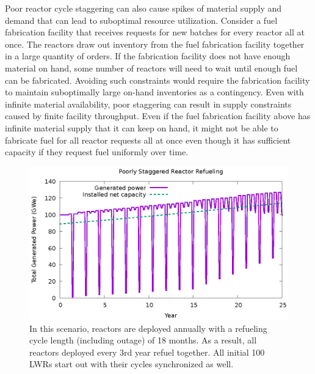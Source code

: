 \documentclass{style}
\begin{document}
Poor reactor cycle staggering can also cause spikes of material supply and
demand that can lead to suboptimal resource utilization.  Consider a fuel
fabrication facility that receives requests for new batches for every reactor
all at once.  The reactors draw out inventory from the fuel fabrication
facility together in a large quantity of orders.  If the fabrication facility
does not have enough material on hand, some number of reactors will need to
wait until enough fuel can be fabricated.  Avoiding such
constraints would require the fabrication facility to maintain suboptimally
large on-hand inventories as a contingency.  Even with infinite material
availability, poor staggering can result in supply constraints caused by
finite facility throughput. Even if the fuel fabrication facility above has
infinite material supply that it can keep on hand, it might not be able to
fabricate fuel for all reactor requests all at once even though it has
sufficient capacity if they request fuel uniformly over time.

\begin{figure}[h]
    \centering
    \includegraphics[width=1.0\columnwidth]{exp2/sync-cycle.eps}
    \caption[The cycle staggering effect]{
        In this scenario, reactors are deployed annually with a refueling cycle
        length (including outage) of 18 months.  As a result, all reactors deployed
        every 3rd year refuel together.  All initial 100 LWRs start out with
        their cycles synchronized as well.
    }
    \label{fig:sync-cycle}
\end{figure}
\end{document}
